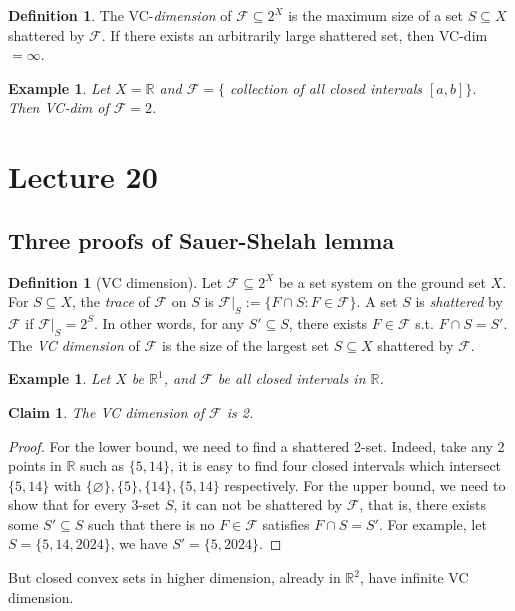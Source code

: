 \documentclass{article}
\newtheorem{claim}[theorem]{Claim}
\newtheorem{example}[theorem]{Example}
\theoremstyle{definition}
\newtheorem{definition}[theorem]{Definition}
\begin{document}
\begin{definition}
    The VC-\emph{dimension} of $\mathcal{F}\subseteq 2^X$ is the maximum size of a set $S\subseteq X$ shattered by $\mathcal{F}$. If there exists an arbitrarily large shattered set, then VC-dim$= \infty$.
\end{definition}
\begin{example}
   Let $X=\mathbb R$ and $\mathcal{F}=\{$ collection of all closed intervals $[a,b]\}$. Then VC-dim of $\mathcal{F}= 2$.
\end{example}








\newpage
\section{Lecture 20}

\subsection{Three proofs of Sauer-Shelah lemma}
\begin{definition}[VC dimension]
    Let $\mathcal{F} \subseteq 2^X$ be a set system on the ground set $X$. For $S \subseteq X$, the \emph{trace} of $\mathcal{F}$ on $S$ is $\mathcal{F}|_{S} := \{ F \cap S: F \in \mathcal{F} \}$. A set $S$ is \emph{shattered} by $\mathcal{F}$ if $\mathcal{F}|_{S} = 2^S$. In other words, for any $S' \subseteq S$, there exists $F \in \mathcal{F}$ s.t. $F\cap S = S'$. The \emph{VC dimension} of $\mathcal{F}$ is the size of the largest set $S \subseteq X$ shattered by $\mathcal{F}$.
\end{definition}

\begin{example}
Let $X$ be $\mathbb{R}^1$, and $\mathcal{F}$ be all closed intervals in $\mathbb{R}$.
\end{example}
\begin{claim}
    The VC dimension of $\mathcal{F}$ is 2. 
\end{claim}
\begin{proof}
    For the lower bound, we need to find a shattered 2-set. Indeed, take any 2 points in $\mathbb{R}$ such as $\{5,14\}$, it is easy to find four closed intervals which intersect $\{5,14\}$ with $\{\varnothing\},\{5\},\{14\},\{5,14\}$ respectively. For the upper bound, we need to show that for every 3-set $S$, it can not be shattered by $\mathcal{F}$, that is, there exists some $S'\subseteq S$ such that there is no $F \in \mathcal{F}$ satisfies $F\cap S=S'$. For example, let $S=\{5,14,2024\}$, we have $S'=\{5,2024\}$.
\end{proof}
But closed convex sets in higher dimension, already in $\mathbb{R}^2$, have infinite VC dimension.
\end{document}
